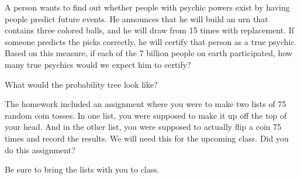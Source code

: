 \documentclass{ximera}
\begin{document}
\begin{question}
A person wants to find out whether people with psychic powers exist by having people predict future events. He announces that he will build an urn that contains three colored balls, and he will draw from 15 times with replacement. If someone predicts the picks correctly, he will certify that person as a true psychic. Based on this measure, if each of the 7 billion people on earth participated, how many true psychics would we expect him to certify?

    \begin{multipleChoice}
    \end{multipleChoice}
    \begin{hint}
    What would the probability tree look like?
    \end{hint}

\end{question}

\begin{question}
The homework included an assignment where you were to make two lists of 75 random coin tosses. In one list, you were supposed to make it up off the top of your head. And in the other list, you were supposed to actually flip a coin 75 times and record the results. We will need this for the upcoming class. Did you do this assignment? 

    \begin{multipleChoice}
    \end{multipleChoice}
    Be sure to bring the lists with you to class.

\end{question}
\end{document}
